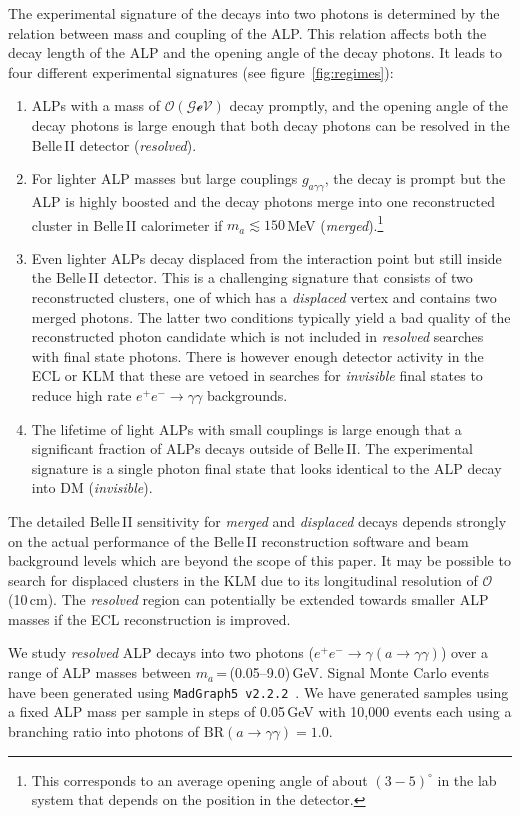 \documentclass[11pt,a4paper]{article}
\newcommand{\ga}{g_{a\gamma\gamma}}
\def \belletwo {Belle\,II\xspace}
\begin{document}
The experimental signature of the decays into two photons is determined by the relation between mass and coupling of the ALP. This relation affects both the decay length of the ALP and the opening angle of the decay photons. It leads to four different experimental signatures (see figure~\ref{fig:regimes}):
\begin{enumerate}
\item  ALPs with a mass of $\mathcal{O(\text{GeV})}$ decay promptly, and the opening angle of the decay photons is large enough that both decay photons can be resolved in the \belletwo detector (\emph{resolved}).
\item For lighter ALP masses but large couplings $\ga$, the decay is prompt but the ALP is highly boosted and the decay photons merge into one reconstructed cluster in  \belletwo calorimeter if $m_a \lesssim 150$\,MeV (\emph{merged}).\footnote{This corresponds to an average opening angle of about $(3-5)^{\circ}$ in the lab system that depends on the position in the detector.}
\item Even lighter ALPs  decay displaced from the interaction point but still inside the \belletwo detector. This is a challenging signature that consists of two reconstructed clusters, one of which has a \emph{displaced} vertex and contains two merged photons. The latter two conditions typically yield a bad quality of the reconstructed photon candidate which is not included in \textit{resolved} searches with final state photons. There is however enough detector activity in the ECL or KLM that these are vetoed in searches for \textit{invisible} final states to reduce high rate $e^+e^-\rightarrow\gamma\gamma$ backgrounds.
\item The lifetime of light ALPs with small couplings is large enough that a significant fraction of ALPs decays outside of \belletwo. The experimental signature is a single photon final state that looks identical to the ALP decay into DM (\emph{invisible}).
\end{enumerate}
The detailed \belletwo sensitivity for \emph{merged} and \emph{displaced} decays depends strongly on the actual performance of the \belletwo reconstruction software and beam background levels which are beyond the scope of this paper. It may be possible to search for displaced clusters in the KLM due to its longitudinal resolution of $\mathcal{O}$(10\,cm). The \textit{resolved} region can potentially be extended towards smaller ALP masses if the ECL reconstruction is improved.

We study \emph{resolved} ALP decays into two photons ($e^+e^-\to \gamma (a\to\gamma\gamma)$) over a range of ALP masses between $m_{a}$\,=\,(0.05--9.0)\,GeV. Signal Monte Carlo events have been generated using \hbox{\texttt{MadGraph5\,v2.2.2}}~\cite{Alwall:2014hca}. We have generated samples using a fixed ALP mass per sample in steps of 0.05\,GeV with 10,000 events each using a branching ratio into photons of $\text{BR}(a\to\gamma\gamma)=1.0$.
\end{document}
